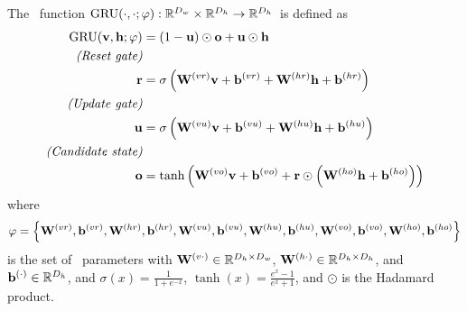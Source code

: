 The \gatedrecurrentunit~function $\operatorname{GRU}(\cdot, \cdot; \varphi) : \mathbb{R}^{D_{w}} \times \mathbb{R}^{D_{h}} \rightarrow \mathbb{R}^{D_{h}}$~is defined as
\begin{align}
\operatorname{GRU}(\mathbf{v}, \mathbf{h}; \varphi) & 
    = (1-\mathbf{u}) \odot \mathbf{o} + \mathbf{u} \odot \mathbf{h}\\
    \textit{(Reset gate)} & \nonumber \\
\mathbf{r} &= 
    \sigma\left(
      \mathbf{W}^{(vr)} \mathbf{v} 
        + \mathbf{b}^{(vr)} +
      \mathbf{W}^{(hr)} \mathbf{h} 
        + \mathbf{b}^{(hr)} 
    \right)\\
    \textit{(Update gate)} & \nonumber \\
\mathbf{u} &= 
    \sigma\left(
      \mathbf{W}^{(vu)} \mathbf{v} 
        + \mathbf{b}^{(vu)} +
      \mathbf{W}^{(hu)} \mathbf{h} 
        + \mathbf{b}^{(hu)} 
    \right)\\
    \textit{(Candidate state)} & \nonumber \\
\mathbf{o} &= \tanh\left(
    \mathbf{W}^{(vo)} \mathbf{v} 
        + \mathbf{b}^{(vo)} + 
    \mathbf{r} \odot \left(
        \mathbf{W}^{(ho)} \mathbf{h} 
            + \mathbf{b}^{(ho)} 
    \right) \right)
\end{align}
where \[\varphi = \left\{
    \mathbf{W}^{(vr)}, 
    \mathbf{b}^{(vr)}, 
    \mathbf{W}^{(hr)}, 
    \mathbf{b}^{(hr)}, 
    \mathbf{W}^{(vu)}, 
    \mathbf{b}^{(vu)}, 
    \mathbf{W}^{(hu)}, 
    \mathbf{b}^{(hu)},
    \mathbf{W}^{(vo)}, 
    \mathbf{b}^{(vo)}, 
    \mathbf{W}^{(ho)}, 
    \mathbf{b}^{(ho)}
  \right\}\] is the set of \gru~parameters with $\mathbf{W}^{(v\cdot)} \in \mathbb{R}^{D_{h} \times D_{w}}$, 
    $\mathbf{W}^{(h\cdot)} \in \mathbb{R}^{D_{h} \times D_{h}}$, 
    and $\mathbf{b}^{(\cdot)} \in \mathbb{R}^{D_{h} }$, 
    and $\sigma(x) = \frac{1}{1+e^{-x}}$, 
    $\tanh(x) = \frac{e^x-1}{e^x+1}$, and $\odot$ is the Hadamard product.
 
